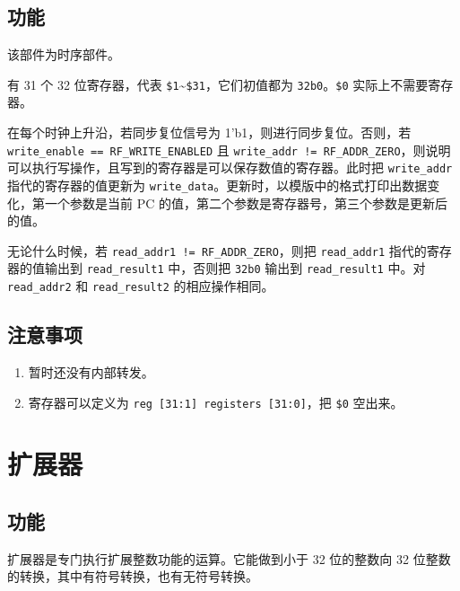 \documentclass[12pt,AutoFakeBold]{article}
\providecommand{\tightlist}{%
  \setlength{\itemsep}{0pt}\setlength{\parskip}{0pt}}
\begin{document}
\hypertarget{ux529fux80fd-4}{%
\subsection{功能}\label{ux529fux80fd-4}}

该部件为时序部件。

有 31 个 32 位寄存器，代表
\texttt{\$1}\textasciitilde{}\texttt{\$31}，它们初值都为 \texttt{32\textquotesingle{}b0}。\texttt{\$0} 实际上不需要寄存器。

在每个时钟上升沿，若同步复位信号为 1'b1，则进行同步复位。否则，若 \texttt{write\_enable\ ==\ RF\_WRITE\_ENABLED} 且
\texttt{write\_addr\ !=\ RF\_ADDR\_ZERO}，则说明可以执行写操作，且写到的寄存器是可以保存数值的寄存器。此时把
\texttt{write\_addr} 指代的寄存器的值更新为
\texttt{write\_data}。更新时，以模版中的格式打印出数据变化，第一个参数是当前 PC 的值，第二个参数是寄存器号，第三个参数是更新后的值。

无论什么时候，若 \texttt{read\_addr1\ !=\ RF\_ADDR\_ZERO}，则把
\texttt{read\_addr1} 指代的寄存器的值输出到 \texttt{read\_result1}
中，否则把 \texttt{32\textquotesingle{}b0} 输出到 \texttt{read\_result1} 中。对 \texttt{read\_addr2} 和 \texttt{read\_result2} 的相应操作相同。

\hypertarget{ux6ce8ux610fux4e8bux9879-3}{%
\subsection{注意事项}\label{ux6ce8ux610fux4e8bux9879-3}}

\begin{enumerate}
\def\labelenumi{\arabic{enumi}.}
\tightlist
\item
  暂时还没有内部转发。
\item
  寄存器可以定义为 \texttt{reg\ {[}31:1{]}\ registers\ {[}31:0{]}}，把
  \texttt{\$0} 空出来。
\end{enumerate}

\hypertarget{ux6269ux5c55ux5668}{%
\section{扩展器}\label{ux6269ux5c55ux5668}}

\hypertarget{ux529fux80fd-5}{%
\subsection{功能}\label{ux529fux80fd-5}}

扩展器是专门执行扩展整数功能的运算。它能做到小于 32 位的整数向 32
位整数的转换，其中有符号转换，也有无符号转换。
\end{document}
